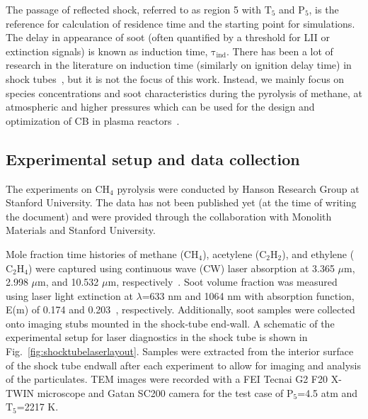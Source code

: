 The passage of reflected shock, referred to as region 5 with $\mathrm{T_5}$ and $\mathrm{P_5}$, is the reference for calculation of residence time and the starting point for simulations. The delay in appearance of soot (often quantified by a threshold for LII or extinction signals) is known as induction time, $\mathrm{\tau_{ind}}$. There has been a lot of research in the literature on induction time (similarly on ignition delay time) in shock tubes~\citep{fussey1978shock}, but it is not the focus of this work. Instead, we mainly focus on species concentrations and soot characteristics during the pyrolysis of methane, at atmospheric and higher pressures which can be used for the design and optimization of CB in plasma reactors~\citep{fulcheri2023energy}. 

%
%

\subsection{Experimental setup and data collection}
\label{sec:shockexpsetup}

The experiments on $\mathrm{CH_4}$ pyrolysis were conducted by Hanson Research Group at Stanford University. The data has not been published yet (at the time of writing the document) and were provided through the collaboration with Monolith Materials and Stanford University.

Mole fraction time histories of methane ($\mathrm{CH_4}$), acetylene ($\mathrm{C_2H_2}$), and ethylene ($\mathrm{C_2H_4}$) were captured using continuous wave (CW) laser absorption at 3.365 $\mu$m, 2.998 $\mu$m, and 10.532 $\mu$m, respectively~\citep{pinkowski2019multi, cassady2020thermal, stranic2014laser}. Soot volume fraction was measured using laser light extinction at $\lambda$=633 nm and 1064 nm with absorption function, E(m) of 0.174 and 0.203~\citep{lee1981optical}, respectively. Additionally, soot samples were collected onto imaging stubs mounted in the shock-tube end-wall. A schematic of the experimental setup for laser diagnostics in the shock tube is shown in Fig.~\ref{fig:shocktubelaserlayout}. Samples were extracted from the interior surface of the shock tube endwall after each experiment to allow for imaging and analysis of the particulates. TEM images were recorded with a FEI Tecnai G2 F20 X-TWIN microscope and Gatan SC200 camera for the test case of $\mathrm{P_5}$=4.5 atm and $\mathrm{T_5}$=2217 K.

